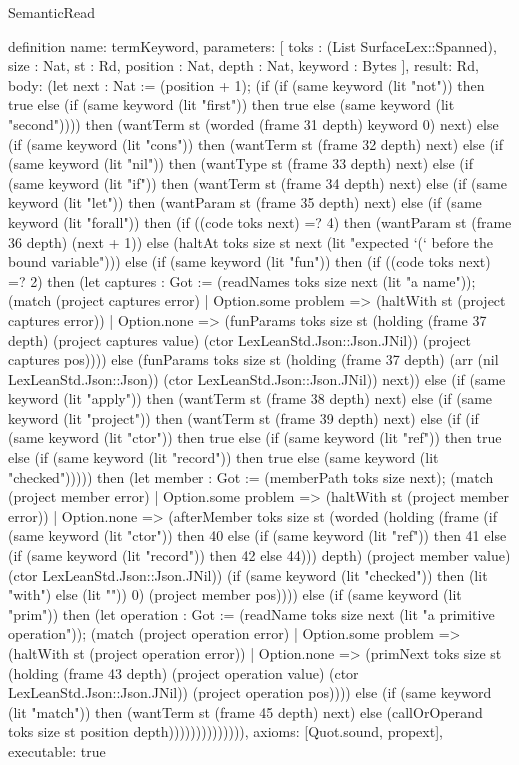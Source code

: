 \begin{lexlean}{SemanticRead}
\begin{semanticmodule}
{definition{
  name: termKeyword,
  parameters: [
    toks : (List SurfaceLex::Spanned),
    size : Nat,
    st : Rd,
    position : Nat,
    depth : Nat,
    keyword : Bytes
  ],
  result: Rd,
  body: (let next : Nat := (position + 1); (if (if (same keyword (lit "not")) then true else (if (same keyword (lit "first")) then true else (same keyword (lit "second")))) then (wantTerm st (worded (frame 31 depth) keyword 0) next) else (if (same keyword (lit "cons")) then (wantTerm st (frame 32 depth) next) else (if (same keyword (lit "nil")) then (wantType st (frame 33 depth) next) else (if (same keyword (lit "if")) then (wantTerm st (frame 34 depth) next) else (if (same keyword (lit "let")) then (wantParam st (frame 35 depth) next) else (if (same keyword (lit "forall")) then (if ((code toks next) =? 4) then (wantParam st (frame 36 depth) (next + 1)) else (haltAt toks size st next (lit "expected `(` before the bound variable"))) else (if (same keyword (lit "fun")) then (if ((code toks next) =? 2) then (let captures : Got := (readNames toks size next (lit "a name")); (match (project captures error)
    | Option.some problem => (haltWith st (project captures error))
    | Option.none => (funParams toks size st (holding (frame 37 depth) (project captures value) (ctor LexLeanStd.Json::Json.JNil)) (project captures pos)))) else (funParams toks size st (holding (frame 37 depth) (arr (nil LexLeanStd.Json::Json)) (ctor LexLeanStd.Json::Json.JNil)) next)) else (if (same keyword (lit "apply")) then (wantTerm st (frame 38 depth) next) else (if (same keyword (lit "project")) then (wantTerm st (frame 39 depth) next) else (if (if (same keyword (lit "ctor")) then true else (if (same keyword (lit "ref")) then true else (if (same keyword (lit "record")) then true else (same keyword (lit "checked"))))) then (let member : Got := (memberPath toks size next); (match (project member error)
    | Option.some problem => (haltWith st (project member error))
    | Option.none => (afterMember toks size st (worded (holding (frame (if (same keyword (lit "ctor")) then 40 else (if (same keyword (lit "ref")) then 41 else (if (same keyword (lit "record")) then 42 else 44))) depth) (project member value) (ctor LexLeanStd.Json::Json.JNil)) (if (same keyword (lit "checked")) then (lit "with") else (lit "")) 0) (project member pos)))) else (if (same keyword (lit "prim")) then (let operation : Got := (readName toks size next (lit "a primitive operation")); (match (project operation error)
    | Option.some problem => (haltWith st (project operation error))
    | Option.none => (primNext toks size st (holding (frame 43 depth) (project operation value) (ctor LexLeanStd.Json::Json.JNil)) (project operation pos)))) else (if (same keyword (lit "match")) then (wantTerm st (frame 45 depth) next) else (callOrOperand toks size st position depth)))))))))))))),
  axioms: [Quot.sound, propext],
  executable: true
}

}
\end{semanticmodule}
\end{lexlean}
